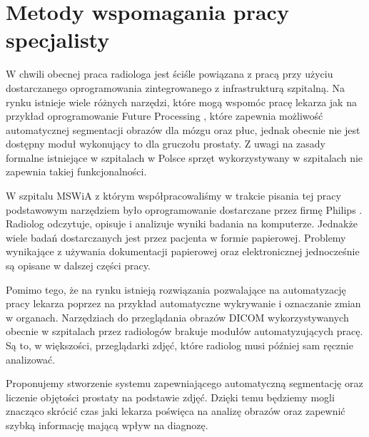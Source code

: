\documentclass[a4paper,11pt,twoside]{report}
\theoremstyle{definition}
\begin{document}
\section{Metody wspomagania pracy specjalisty}
W chwili obecnej praca radiologa jest ściśle powiązana z pracą przy użyciu dostarczanego oprogramowania zintegrowanego z infrastrukturą szpitalną. Na rynku istnieje wiele różnych narzędzi, które mogą wspomóc pracę lekarza jak na przykład oprogramowanie Future Processing \cite{FP}, które zapewnia możliwość automatycznej segmentacji obrazów dla mózgu oraz płuc, jednak obecnie nie jest dostępny moduł wykonujący to dla gruczołu prostaty. Z uwagi na zasady formalne istniejące w szpitalach w Polsce sprzęt wykorzystywany w szpitalach nie zapewnia takiej funkcjonalności.
\par
W szpitalu MSWiA z którym współpracowaliśmy w trakcie pisania tej pracy podstawowym narzędziem było oprogramowanie dostarczane przez firmę Philips \cite{Philips}. Radiolog odczytuje, opisuje i analizuje wyniki badania na komputerze. Jednakże wiele badań dostarczanych jest przez pacjenta w formie papierowej. Problemy wynikające z używania dokumentacji papierowej oraz elektronicznej jednocześnie są opisane w dalszej części pracy.
\par
Pomimo tego, że na rynku istnieją rozwiązania pozwalające na automatyzację pracy lekarza poprzez na przykład automatyczne wykrywanie i oznaczanie zmian w organach. Narzędziach do przeglądania obrazów DICOM wykorzystywanych obecnie w szpitalach przez radiologów brakuje modułów automatyzujących pracę. Są to, w większości, przeglądarki zdjęć, które radiolog musi później sam ręcznie analizować. 
\par
Proponujemy stworzenie systemu zapewniającego automatyczną segmentację oraz liczenie objętości prostaty na podstawie zdjęć. Dzięki temu będziemy mogli znacząco skrócić czas jaki lekarza poświęca na analizę obrazów oraz zapewnić szybką informację mającą wpływ na diagnozę.
\end{document}
